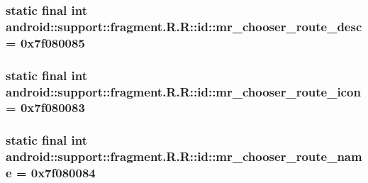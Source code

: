 \hypertarget{classandroid_1_1support_1_1fragment_1_1_r_1_1id_58751fcdfeef7c6d5ed50d48f7d6ce01}{
\subsubsection[{mr\_\-chooser\_\-route\_\-desc}]{\setlength{\rightskip}{0pt plus 5cm}static final int android::support::fragment.R.R::id::mr\_\-chooser\_\-route\_\-desc = 0x7f080085}}
\label{classandroid_1_1support_1_1fragment_1_1_r_1_1id_58751fcdfeef7c6d5ed50d48f7d6ce01}


\hypertarget{classandroid_1_1support_1_1fragment_1_1_r_1_1id_abf2f501c189cd1ff19fe9c11a88033b}{
\subsubsection[{mr\_\-chooser\_\-route\_\-icon}]{\setlength{\rightskip}{0pt plus 5cm}static final int android::support::fragment.R.R::id::mr\_\-chooser\_\-route\_\-icon = 0x7f080083}}
\label{classandroid_1_1support_1_1fragment_1_1_r_1_1id_abf2f501c189cd1ff19fe9c11a88033b}


\hypertarget{classandroid_1_1support_1_1fragment_1_1_r_1_1id_0a156bbe5fdd1eecc0db77ac7addecc2}{
\subsubsection[{mr\_\-chooser\_\-route\_\-name}]{\setlength{\rightskip}{0pt plus 5cm}static final int android::support::fragment.R.R::id::mr\_\-chooser\_\-route\_\-name = 0x7f080084}}
\label{classandroid_1_1support_1_1fragment_1_1_r_1_1id_0a156bbe5fdd1eecc0db77ac7addecc2}



